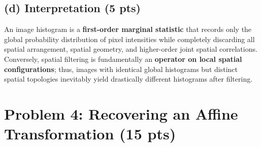 \documentclass[11pt,a4paper]{article}
\begin{document}
\subsection{(d) Interpretation (5 pts)}
An image histogram is a \textbf{first-order marginal statistic} that records only the global probability distribution of pixel intensities while completely discarding all spatial arrangement, spatial geometry, and higher-order joint spatial correlations. Conversely, spatial filtering is fundamentally an \textbf{operator on local spatial configurations}; thus, images with identical global histograms but distinct spatial topologies inevitably yield drastically different histograms after filtering.

\section{Problem 4: Recovering an Affine Transformation (15 pts)}
\end{document}
